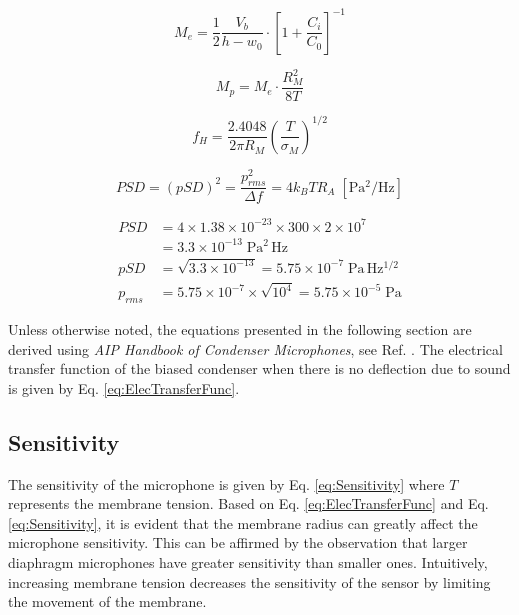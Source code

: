 \documentclass[journal]{IEEEtran}
\begin{document}
\begin{figure}[ht]
	\begin{equation}
		M_e = \frac{1}{2} \frac{V_b}{h-w_0} \cdot \left[ 1 + \frac{C_i}{C_0} \right]^{-1}
		\label{eq:ElecTransferFunc}
	\end{equation}
	
	\begin{equation}
		M_p = M_e \cdot \frac{R_M^2}{8T}
		\label{eq:Sensitivity}
	\end{equation}
	
	\begin{equation}
		f_H = \frac{2.4048}{2\pi R_M} \left( \frac{T}{\sigma_M} \right)^{1/2}
		\label{eq:FreqResponse}
	\end{equation}
	
	\begin{equation}
		PSD = (pSD)^2 = \frac{p_{rms}^2}{\Delta f} = 4 k_B T R_A \; \mathrm{[Pa^2/Hz]}
		\label{eq:PSD}
	\end{equation}

	\begin{align*}
		PSD &= 4 \times 1.38 \times 10^{-23} \times 300 \times 2 \times 10^7 \\
		    &= 3.3 \times 10^{-13} \; \mathrm{Pa^2\,Hz} \\
		pSD &= \sqrt{3.3 \times 10^{-13}} = 5.75 \times 10^{-7} \; \mathrm{Pa\,Hz^{1/2}} \\
		p_{rms} &= 5.75 \times 10^{-7} \times \sqrt{10^4} = 5.75 \times 10^{-5}\;\mathrm{Pa}
	\end{align*}
	
\end{figure}

Unless otherwise noted, the equations presented in the following section are derived using \emph{AIP Handbook of Condenser Microphones}, see Ref. \cite{aip}. The electrical transfer function of the biased condenser when there is no deflection due to sound is given by Eq. \ref{eq:ElecTransferFunc}.

\subsection{Sensitivity}

The sensitivity of the microphone is given by Eq. \ref{eq:Sensitivity} where $T$ represents the membrane tension. Based on Eq. \ref{eq:ElecTransferFunc} and Eq. \ref{eq:Sensitivity}, it is evident that the membrane radius can greatly affect the microphone sensitivity. This can be affirmed by the observation that larger diaphragm microphones have greater sensitivity than smaller ones. Intuitively, increasing membrane tension decreases the sensitivity of the sensor by limiting the movement of the membrane.
\end{document}
